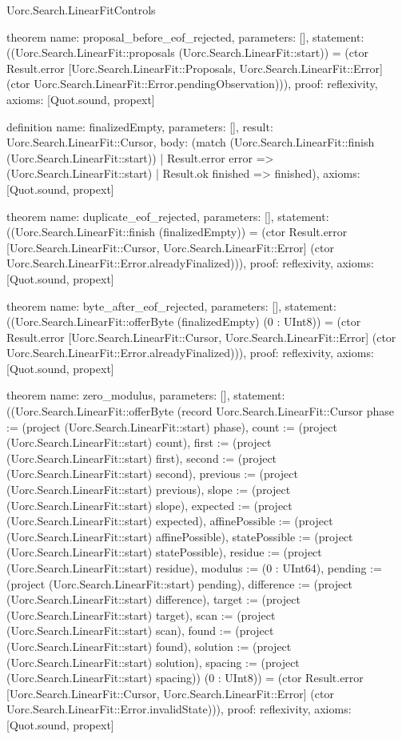 \begin{lexlean}{Uorc.Search.LinearFitControls}
\begin{semanticmodule}
theorem{
  name: proposal_before_eof_rejected,
  parameters: [],
  statement: ((Uorc.Search.LinearFit::proposals (Uorc.Search.LinearFit::start)) = (ctor Result.error [Uorc.Search.LinearFit::Proposals, Uorc.Search.LinearFit::Error] (ctor Uorc.Search.LinearFit::Error.pendingObservation))),
  proof: reflexivity{},
  axioms: [Quot.sound, propext]
}

definition{
  name: finalizedEmpty,
  parameters: [],
  result: Uorc.Search.LinearFit::Cursor,
  body: (match (Uorc.Search.LinearFit::finish (Uorc.Search.LinearFit::start))
    | Result.error error => (Uorc.Search.LinearFit::start)
    | Result.ok finished => finished),
  axioms: [Quot.sound, propext]
}

theorem{
  name: duplicate_eof_rejected,
  parameters: [],
  statement: ((Uorc.Search.LinearFit::finish (finalizedEmpty)) = (ctor Result.error [Uorc.Search.LinearFit::Cursor, Uorc.Search.LinearFit::Error] (ctor Uorc.Search.LinearFit::Error.alreadyFinalized))),
  proof: reflexivity{},
  axioms: [Quot.sound, propext]
}

theorem{
  name: byte_after_eof_rejected,
  parameters: [],
  statement: ((Uorc.Search.LinearFit::offerByte (finalizedEmpty) (0 : UInt8)) = (ctor Result.error [Uorc.Search.LinearFit::Cursor, Uorc.Search.LinearFit::Error] (ctor Uorc.Search.LinearFit::Error.alreadyFinalized))),
  proof: reflexivity{},
  axioms: [Quot.sound, propext]
}

theorem{
  name: zero_modulus,
  parameters: [],
  statement: ((Uorc.Search.LinearFit::offerByte (record Uorc.Search.LinearFit::Cursor {phase := (project (Uorc.Search.LinearFit::start) phase), count := (project (Uorc.Search.LinearFit::start) count), first := (project (Uorc.Search.LinearFit::start) first), second := (project (Uorc.Search.LinearFit::start) second), previous := (project (Uorc.Search.LinearFit::start) previous), slope := (project (Uorc.Search.LinearFit::start) slope), expected := (project (Uorc.Search.LinearFit::start) expected), affinePossible := (project (Uorc.Search.LinearFit::start) affinePossible), statePossible := (project (Uorc.Search.LinearFit::start) statePossible), residue := (project (Uorc.Search.LinearFit::start) residue), modulus := (0 : UInt64), pending := (project (Uorc.Search.LinearFit::start) pending), difference := (project (Uorc.Search.LinearFit::start) difference), target := (project (Uorc.Search.LinearFit::start) target), scan := (project (Uorc.Search.LinearFit::start) scan), found := (project (Uorc.Search.LinearFit::start) found), solution := (project (Uorc.Search.LinearFit::start) solution), spacing := (project (Uorc.Search.LinearFit::start) spacing)}) (0 : UInt8)) = (ctor Result.error [Uorc.Search.LinearFit::Cursor, Uorc.Search.LinearFit::Error] (ctor Uorc.Search.LinearFit::Error.invalidState))),
  proof: reflexivity{},
  axioms: [Quot.sound, propext]
}


\end{semanticmodule}
\end{lexlean}
